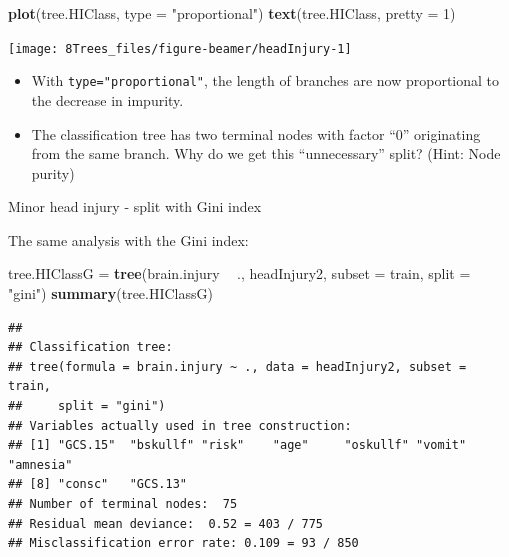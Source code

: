 \documentclass[10pt,ignorenonframetext,]{beamer}
\newenvironment{Shaded}{\begin{snugshade}}{\end{snugshade}}
\newcommand{\KeywordTok}[1]{\textcolor[rgb]{0.13,0.29,0.53}{\textbf{#1}}}
\newcommand{\DataTypeTok}[1]{\textcolor[rgb]{0.13,0.29,0.53}{#1}}
\newcommand{\DecValTok}[1]{\textcolor[rgb]{0.00,0.00,0.81}{#1}}
\newcommand{\StringTok}[1]{\textcolor[rgb]{0.31,0.60,0.02}{#1}}
\newcommand{\OperatorTok}[1]{\textcolor[rgb]{0.81,0.36,0.00}{\textbf{#1}}}
\newcommand{\NormalTok}[1]{#1}
\begin{document}
\begin{frame}[fragile]

\scriptsize

\begin{Shaded}
\begin{Highlighting}[]
\KeywordTok{plot}\NormalTok{(tree.HIClass, }\DataTypeTok{type =} \StringTok{"proportional"}\NormalTok{)}
\KeywordTok{text}\NormalTok{(tree.HIClass, }\DataTypeTok{pretty =} \DecValTok{1}\NormalTok{)}
\end{Highlighting}
\end{Shaded}

\begin{center}\texttt{[image: 8Trees\_files/figure-beamer/headInjury-1]} \end{center}

\normalsize

\begin{itemize}
\item
  With \texttt{type="proportional"}, the length of branches are now
  proportional to the decrease in impurity.
\item
  The classification tree has two terminal nodes with factor ``0''
  originating from the same branch. Why do we get this ``unnecessary''
  split? (Hint: Node purity)
\end{itemize}

\end{frame}

\begin{frame}[fragile]

\begin{block}{Minor head injury - split with Gini index}

\vspace{1mm} The same analysis with the Gini index:

\scriptsize

\begin{Shaded}
\begin{Highlighting}[]
\NormalTok{tree.HIClassG =}\StringTok{ }\KeywordTok{tree}\NormalTok{(brain.injury }\OperatorTok{~}\StringTok{ }\NormalTok{., headInjury2, }\DataTypeTok{subset =}\NormalTok{ train, }\DataTypeTok{split =} \StringTok{"gini"}\NormalTok{)}
\KeywordTok{summary}\NormalTok{(tree.HIClassG)}
\end{Highlighting}
\end{Shaded}

\begin{verbatim}
## 
## Classification tree:
## tree(formula = brain.injury ~ ., data = headInjury2, subset = train, 
##     split = "gini")
## Variables actually used in tree construction:
## [1] "GCS.15"  "bskullf" "risk"    "age"     "oskullf" "vomit"   "amnesia"
## [8] "consc"   "GCS.13" 
## Number of terminal nodes:  75 
## Residual mean deviance:  0.52 = 403 / 775 
## Misclassification error rate: 0.109 = 93 / 850
\end{verbatim}

\end{block}

\end{frame}
\end{document}
